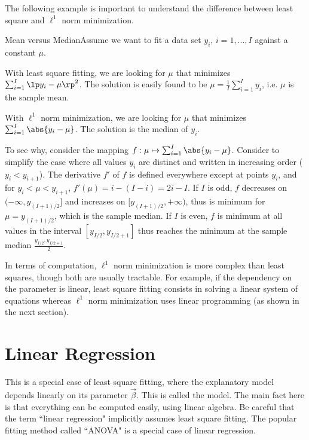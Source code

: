The following example is important to understand
the difference between least square and $\ell^1$
norm minimization.
\begin{ex}{Mean versus Median}Assume we want to
fit a data set $y_i$,  $i=1,...,I$ against a
constant $\mu$.

With least square fitting, we are looking for
$\mu$ that minimizes $\sum_{i=1}^I \lp y_i -\mu
\rp^2$. The solution is easily found to be
$\mu=\frac{1}{I}\sum_{i=1}^I y_i$, i.e. $\mu$ is
the sample mean.

With $\ell^1$ norm minimization, we are looking
for $\mu$ that minimizes $\sum_{i=1}^I \abs{ y_i
-\mu }$. The solution is the median of $y_i$.

To see why, consider the mapping $f: \mu \mapsto \sum_{i=1}^I
\abs{ y_i -\mu }$. Consider to simplify the case where all
values $y_i$ are distinct and written in increasing order
($y_i< y_{i+1}$). The derivative $f'$ of $f$ is defined
everywhere except at points $y_i$, and for $y_i < \mu
<y_{i+1}$, $f'(\mu) = i - (I-i)= 2i-I$. If $I$ is odd, $f$
decreases on $(-\infty, y_{(I+1)/2}]$ and increases on
$[y_{(I+1)/2}, +\infty)$, thus is minimum for $\mu=
y_{(I+1)/2}$, which is the sample median. If $I$ is even, $f$
is minimum at all values in the interval $[y_{I/2}, y_{I/2+1}]$
thus reaches the minimum at the sample median $\frac{y_{I/2},
y_{I/2+1}}{2} $. \label{ex-mean-median}
\end{ex}

In terms of computation, $\ell^1$ norm
minimization is more complex than least squares,
though both are usually tractable. For example,
if the dependency on the parameter is linear,
least square fitting consists in solving a linear
system of equations whereas $\ell^1$ norm
minimization uses linear programming (as shown in
the next section).

\section{Linear Regression}
 This is a special case of least
square fitting, where the explanatory model
depends linearly on its parameter $\vec{\beta}$.
This is called the  model.
The main fact here is that everything can be
computed easily, using linear algebra. Be careful
that the term ``linear regression" implicitly
assumes least square fitting. The popular fitting
method called ``ANOVA" is a special case of
linear regression.

